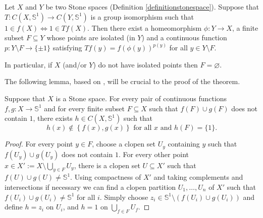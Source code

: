 \begin{theorem}\label{theoremisomorphismgroupifcirclevaluedfunctions}
Let $X$ and $Y$ be two Stone spaces (Definition \ref{definitionstonespace}). Suppose that $T:C(X,\mathbb{S}^1)\to C(Y,\mathbb{S}^1)$ is a group isomorphism such that $1\in f(X)\iff 1\in Tf(X)$. Then there exist a homeomorphism $\phi:Y\to X$, a finite subset $F\subseteq Y$ whose points are isolated (in $Y$) and a continuous function $p:Y\setminus F\to\{\pm 1\}$ satisfying $Tf(y)=f(\phi(y))^{p(y)}$ for all $y\in Y\setminus F$.

In particular, if $X$ (and/or $Y$) do not have isolated points then $F=\varnothing$.
\end{theorem}

The following lemma, based on \cite{MR3162258}, will be crucial to the proof of the theorem.

\begin{lemma}\label{lemmatheoremisomorphismgroupifcirclevaluedfunctions}
Suppose that $X$ is a Stone space. For every pair of continuous functions $f,g:X\to\mathbb{S}^1$ and for every finite subset $F\subseteq X$ such that $f(F)\cup g(F)$ does not contain $1$, there exists $h\in C(X,\mathbb{S}^1)$ such that
\[h(x)\not\in\left\{f(x),g(x)\right\}\text{ for all }x\text{ and }h(F)=\{1\}.\]
\end{lemma}
\begin{proof}
For every point $y\in F$, choose a clopen set $U_y$ containing $y$ such that $f(U_y)\cup g(U_y)$ does not contain $1$. For every other point $x\in X':=X\setminus\bigcup_{y\in F}U_y$, there is a clopen set $U\subseteq X'$ such that $f(U)\cup g(U)\neq\mathbb{S}^1$. Using compactness of $X'$ and taking complements and intersections if necessary we can find a clopen partition $U_1,\ldots,U_n$ of $X'$ such that $f(U_i)\cup g(U_i)\neq\mathbb{S}^1$ for all $i$. Simply choose $z_i\in \mathbb{S}^1\setminus(f(U_i)\cup g(U_i))$ and define $h=z_i$ on $U_i$, and $h=1$ on $\bigcup_{f\in F}U_f$.\qedhere
\end{proof}

